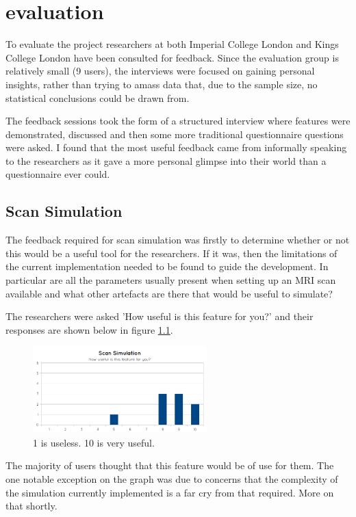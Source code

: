 \chapter{evaluation}\label{chapter:evaluation}

To evaluate the project researchers at both Imperial College London and Kings College London have been consulted for feedback. Since the evaluation group is relatively small (9 users), the interviews were focused on gaining personal insights, rather than trying to amass data that, due to the sample size, no statistical conclusions could be drawn from.

The feedback sessions took the form of a structured interview where features were demonstrated, discussed and then some more traditional questionnaire questions were asked. I found that the most useful feedback came from informally speaking to the researchers as it gave a more personal glimpse into their world than a questionnaire ever could. 

\section{Scan Simulation}
The feedback required for scan simulation was firstly to determine whether or not this would be a useful tool for the researchers. If it was, then the limitations of the current implementation needed to be found to guide the development. In particular are all the parameters usually present when setting up an MRI scan available and what other artefacts are there that would be useful to simulate?

The researchers were asked 'How useful is this feature for you?' and their responses are shown below in figure \ref{fig:graph_scansimulation_1}.

\begin{figure}[h]
    \centering
	\includegraphics[width=0.6\textwidth]{images/evaluation/graph_scan_simulation_1.png}
    \caption{1 is useless. 10 is very useful.}\label{fig:graph_scansimulation_1}
\end{figure}

The majority of users thought that this feature would be of use for them. The one notable exception on the graph was due to concerns that the complexity of the simulation currently implemented is a far cry from that required. More on that shortly.


